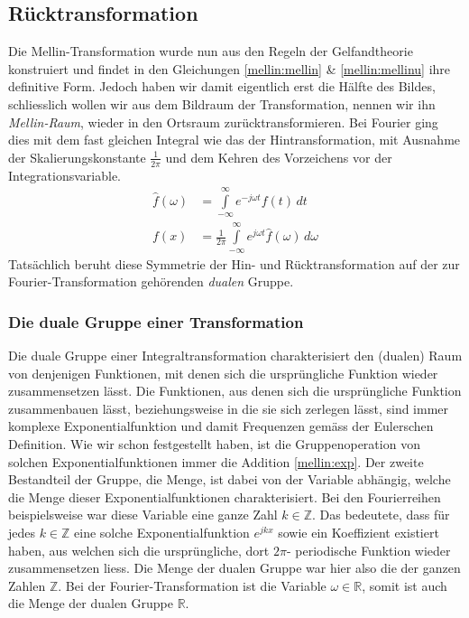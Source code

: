 \subsection{Rücktransformation
\label{mellin:subsection:ruecktransformation}}
Die Mellin-Transformation wurde nun aus den Regeln der Gelfandtheorie 
konstruiert und findet in den Gleichungen \eqref{mellin:mellin} \& 
\eqref{mellin:mellinu} ihre definitive Form.
Jedoch haben wir damit eigentlich erst die Hälfte des Bildes, schliesslich 
wollen wir aus dem Bildraum der Transformation, nennen wir ihn 
{\em Mellin-Raum}, wieder in den Ortsraum zurücktransformieren. 
Bei Fourier ging dies mit dem fast gleichen Integral wie das der 
Hintransformation, mit Ausnahme der Skalierungskonstante $\frac{1}{2\pi}$
und dem Kehren des Vorzeichens vor der Integrationsvariable.
\begin{align*}
    \hat{f}(\omega) &= \int\limits_{-\infty}^{\infty} 
    e^{-j\omega{}t} f(t) \,{d}t \\
    f(x) &= \frac{1}{2\pi} \int\limits_{-\infty}^{\infty} 
    e^{j\omega t} \hat{f}(\omega) \,{d}\omega
\end{align*}
Tatsächlich beruht diese Symmetrie der Hin- und Rücktransformation auf der 
zur Fourier-Transformation gehörenden {\em dualen} Gruppe.
\subsubsection{Die duale Gruppe einer Transformation}
Die duale Gruppe einer Integraltransformation charakterisiert den 
(dualen) Raum von denjenigen Funktionen, mit denen sich die 
ursprüngliche Funktion wieder zusammensetzen lässt.
Die Funktionen, aus denen sich die ursprüngliche Funktion zusammenbauen 
lässt, beziehungsweise in die sie sich zerlegen lässt, 
sind immer komplexe Exponentialfunktion und damit Frequenzen gemäss 
der Eulerschen Definition.
Wie wir schon festgestellt haben, ist die Gruppenoperation von solchen 
Exponentialfunktionen immer die Addition \eqref{mellin:exp}.
Der zweite Bestandteil der Gruppe, die Menge, ist dabei von der Variable 
abhängig, welche die Menge dieser Exponentialfunktionen charakterisiert.
Bei den Fourierreihen beispielsweise war diese Variable eine ganze
Zahl $k \in \mathbb{Z}$.
Das bedeutete, dass für jedes $k \in \mathbb{Z}$ eine solche 
Exponentialfunktion $e^{jkx}$ sowie ein Koeffizient existiert haben, aus 
welchen sich die ursprüngliche, dort $2\pi$- periodische Funktion wieder 
zusammensetzen liess.
Die Menge der dualen Gruppe war hier also die der ganzen Zahlen 
$\mathbb{Z}$. 
Bei der Fourier-Transformation ist die Variable $\omega \in \mathbb{R}$, 
somit ist auch die Menge der dualen Gruppe $\mathbb{R}$.

